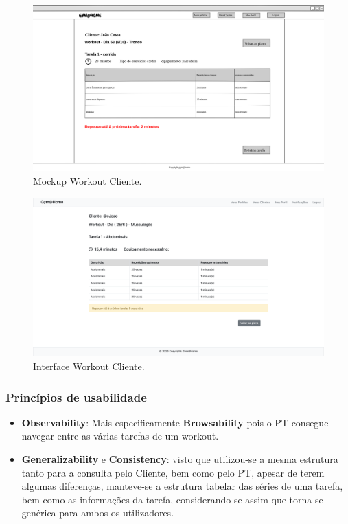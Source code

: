 \begin{figure}[H]
    \centering
    \includegraphics[scale=0.25]{images/mockups/pt_plano_do_cliente_tarefa_1.png}
    \caption{Mockup Workout Cliente.}
    \label{fig:mockupworkoutcliente}
\end{figure}

\begin{figure}[H]
    \centering
    \includegraphics[scale=0.25]{images/interfaces/pt_workout.png}
    \caption{Interface Workout Cliente.}
    \label{fig:interfaceworkoutacliente}
\end{figure}

\subsubsection{Princípios de usabilidade}
\begin{itemize}
    \item \textbf{Observability}: Mais especificamente \textbf{Browsability} pois o PT consegue navegar entre as várias tarefas de um workout.
    
    \item \textbf{Generalizability} e \textbf{Consistency}: visto que utilizou-se a mesma estrutura tanto para a consulta pelo Cliente, bem como pelo PT, apesar de terem algumas diferenças, manteve-se a estrutura tabelar das séries de uma tarefa, bem como as informações da tarefa, considerando-se assim que torna-se genérica para ambos os utilizadores.
\end{itemize}

